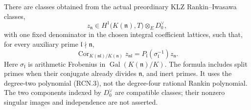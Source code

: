 \begin{theorem}
\label{AC-K33-ray-classes}
There are classes obtained from the actual preordinary
KLZ Rankin--Iwasawa classes,
\[
 z_{\mathfrak n}\in
 H^1\bigl(K(\mathfrak n),T\bigr)\otimes_E D_0^\vee ,
 \tag{RCN.8}
\]
with one fixed denominator in the chosen integral coefficient
lattices, such that, for every auxiliary prime
\(\mathfrak l\nmid\mathfrak n\),
\[
 \operatorname{Cor}_{K(\mathfrak n\mathfrak l)/K(\mathfrak n)}
        z_{\mathfrak n\mathfrak l}
   =P_{\mathfrak l}(\sigma_{\mathfrak l}^{-1})z_{\mathfrak n}.
 \tag{RCN.9}
\]
Here \(\sigma_{\mathfrak l}\) is arithmetic Frobenius in
\(\operatorname{Gal}(K(\mathfrak n)/K)\).
The formula includes split primes when their conjugate
already divides \(\mathfrak n\), and inert primes.
It uses the degree-two polynomial (RCN.3), not the
degree-four rational Rankin polynomial.
The two components indexed by \(D_0^\vee\) are compatible
classes; their nonzero singular images and independence
are not asserted.
\end{theorem}
